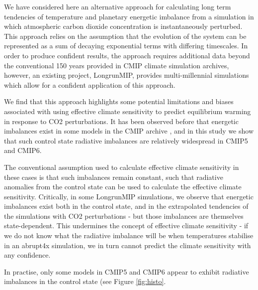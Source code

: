 \documentclass[esd, article]{copernicus}
\begin{document}
\conclusions  
We have considered here an alternative approach for calculating long term tendencies of temperature and planetary energetic imbalance from a simulation in which atmospheric carbon dioxide concentration is instantaneously perturbed.  This approach relies on the assumption that the evolution of the system can be represented as a sum of decaying exponential terms with differing timescales.  In order to produce confident results, the approach requires additional data beyond the conventional 150 years provided in CMIP climate simulation archives, however, an existing project, LongrunMIP, provides multi-millennial simulations which allow for a confident application of this approach.

We find that this approach highlights some potential limitations and biases associated with using effective climate sensitivity to predict equilibrium warming in response to CO2 perturbations. 
It has been observed before that energetic imbalances exist in some models in the CMIP archive \cite{rugenstein2019longrunmip}, and in this study we show that such control state radiative imbalances are relatively widespread in CMIP5 and CMIP6.  

The conventional assumption used to calculate effective climate sensitivity in these cases is that such imbalances remain constant, such that radiative anomalies from the control state can be used to calculate the effective climate sensitivity.  Critically, in some LongrunMIP simulations, we observe that energetic imbalances exist both in the control state, and in the extrapolated tendencies of the simulations with CO2 perturbations - but those imbalances are themselves state-dependent.  This undermines the concept of effective climate sensitivity - if we do not know what the radiative imbalance will be when temperatures stabilise in an abrupt4x simulation, we in turn cannot predict the climate sensitivity with any confidence.

In practise, only some models in CMIP5 and CMIP6 appear to exhibit radiative imbalances in the control state (see Figure \ref{fig:histo}. 




\end{document}

